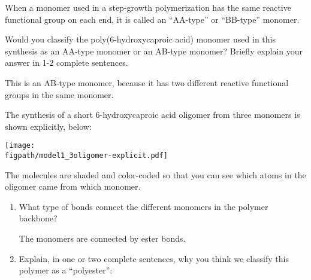 \begin{activity}
\begin{infobox}
	When a monomer used in a step-growth polymerization has the same reactive functional group on each end, it is called an ``AA-type'' or ``BB-type'' monomer.

\end{infobox}

\begin{ctqs}
		
		\question Would you classify the poly(6-hydroxycaproic acid) monomer used in this synthesis as an AA-type monomer or an AB-type monomer?  Briefly explain your answer in 1-2 complete sentences.
			
				\begin{solution}[1.75in]
					This is an AB-type monomer, because it has two different reactive functional groups in the same monomer.
				\end{solution}
		
		\question The synthesis of a short 6-hydroxycaproic acid oligomer from three monomers is shown explicitly, below: \label{\labelbase:ctq:6hcpa-oligomer}
	
\vspace{0.25in}	\centerline{\texttt{[image: \\figpath/model1\_3oligomer-explicit.pdf]}}
The molecules are shaded and color-coded so that you can see which atoms in the oligomer came from which monomer.
		
		\begin{enumerate}
		
			\item What type of bonds connect the different monomers in the polymer backbone?
			
				\begin{solution}[1.5in]
					The monomers are connected by ester bonds.
				\end{solution}
		
			\item Explain, in one or two complete sentences, why you think we classify this polymer as a ``polyester'':
			
				\begin{solution}[2in]\end{solution}
	

\end{enumerate}
\end{ctqs}
\end{activity}
